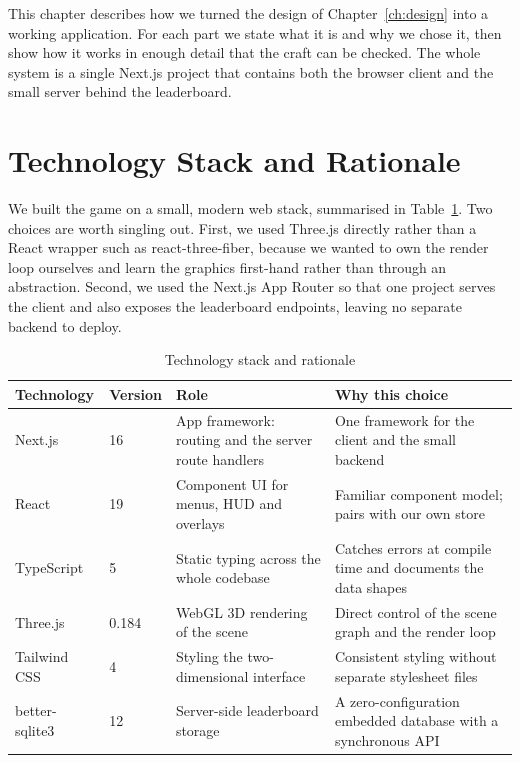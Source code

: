 \documentclass[12pt,a4paper]{report}
\begin{document}
This chapter describes how we turned the design of Chapter~\ref{ch:design} into
a working application. For each part we state what it is and why we chose it,
then show how it works in enough detail that the craft can be checked. The whole
system is a single Next.js project that contains both the browser client and the
small server behind the leaderboard.

\section{Technology Stack and Rationale}

We built the game on a small, modern web stack, summarised in
Table~\ref{tab:stack}. Two choices are worth singling out. First, we used
Three.js directly rather than a React wrapper such as react-three-fiber, because
we wanted to own the render loop ourselves and learn the graphics first-hand
rather than through an abstraction. Second, we used the Next.js App Router so
that one project serves the client and also exposes the leaderboard endpoints,
leaving no separate backend to deploy.

\begin{table}[htbp]
\centering
\caption{Technology stack and rationale}
\label{tab:stack}
\begin{tabular}{|p{2.6cm}|p{1.2cm}|p{4.0cm}|p{4.2cm}|}
\hline
Technology & Version & Role & Why this choice \\
\hline
Next.js & 16 & App framework: routing and the server route handlers &
One framework for the client and the small backend \\
\hline
React & 19 & Component UI for menus, HUD and overlays &
Familiar component model; pairs with our own store \\
\hline
TypeScript & 5 & Static typing across the whole codebase &
Catches errors at compile time and documents the data shapes \\
\hline
Three.js & 0.184 & WebGL 3D rendering of the scene &
Direct control of the scene graph and the render loop \\
\hline
Tailwind CSS & 4 & Styling the two-dimensional interface &
Consistent styling without separate stylesheet files \\
\hline
better-sqlite3 & 12 & Server-side leaderboard storage &
A zero-configuration embedded database with a synchronous API \\
\hline
\end{tabular}
\end{table}
\end{document}
